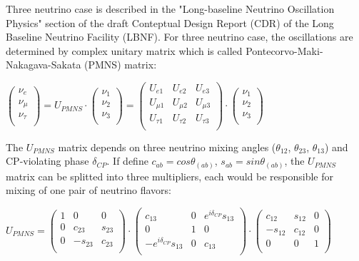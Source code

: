 Three neutrino case is described in the "Long-baseline Neutrino Oscillation Physics" section of the draft Conteptual Design Report (CDR) of the Long Baseline Neutrino Facility (LBNF). For three neutrino case, the oscillations are determined by complex unitary matrix which is called Pontecorvo-Maki-Nakagava-Sakata (PMNS) matrix:\\
\begin{center}
$ \begin{pmatrix} \nu_{e} \\ \nu_{\mu} \\ \nu_{\tau} \\ \end{pmatrix}
 = U_{PMNS}\cdot \begin{pmatrix} \nu_{1} \\ \nu_{2} \\ \nu_{3} \\ \end{pmatrix} = 
 \begin{pmatrix}
  U_{e1} & U_{e2} & U_{e3} \\
  U_{\mu1} & U_{\mu2} & U_{\mu3} \\
  U_{\tau1} & U_{\tau2} & U_{\tau3} \\
 \end{pmatrix}
 \cdot
\begin{pmatrix} \nu_{1} \\ \nu_{2} \\ \nu_{3} \\ \end{pmatrix}$\\
\end{center}
The $U_{PMNS}$ matrix depends on three neutrino mixing angles ($\theta_{12}$, $\theta_{23}$, $\theta_{13}$) and CP-violating phase $\delta_{CP}$. If define $c_{ab}=cos\theta_(ab)$, $s_{ab}=sin\theta_(ab)$, the $U_{PMNS}$ matrix can be splitted into three multipliers, each would be responsible for mixing of one pair of neutrino flavors:\\
\begin{center}
$U_{PMNS} =
 \begin{pmatrix}
  1 & 0 & 0 \\
  0 & c_{23} & s_{23} \\
  0 & -s_{23} & c_{23} \\
 \end{pmatrix}
 \cdot
 \begin{pmatrix}
  c_{13} & 0 & e^{i\delta_{CP}}s_{13} \\
  0 & 1 & 0 \\
  -e^{i\delta_{CP}}s_{13} & 0 & c_{13} \\
 \end{pmatrix}
 \cdot
 \begin{pmatrix}
  c_{12} & s_{12} & 0 \\
  -s_{12} & c_{12} & 0 \\
  0 & 0 & 1 \\
 \end{pmatrix}$ \\
\end{center}
